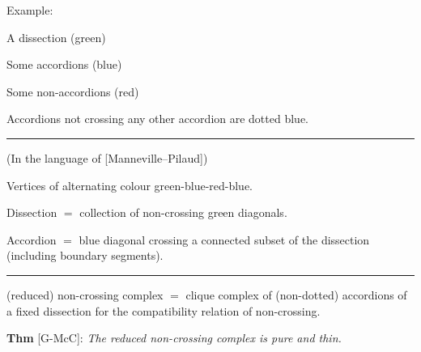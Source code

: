 \documentclass[portrait,final,a0paper,fontscale=0.25]{baposter}
\theoremstyle{definition}
\begin{document}
\begin{poster}
{\vspace*{-3cm}
\begin{minipage}{5.7cm}
Example:

\smallskip
\begin{compactitem}
 \item A dissection (green)
 \item Some accordions (blue)
 \item Some non-accordions (red)
\end{compactitem}

\medskip
Accordions not crossing any other accordion are dotted blue.
\end{minipage}


\vspace{.4cm}
\hspace{-.25cm}
{\color{blue} \rule{10.02cm}{1pt}}
\vspace{-.35cm}

(In the language of [Manneville--Pilaud])

\smallskip

Vertices of alternating colour green-blue-red-blue.

\smallskip

{\color{blue} Dissection} $=$ collection of non-crossing green diagonals.

\smallskip

{\color{blue} Accordion} $=$ blue diagonal crossing a connected subset of the dissection (including boundary segments).


\vspace{-.1cm}
\hspace{-.25cm}
{\color{blue} \rule{10.02cm}{1pt}}
\vspace{-.35cm}

{\color{blue} (reduced) non-crossing complex} $=$ clique complex of (non-dotted) accordions of a fixed dissection for the compatibility relation of non-crossing.

\smallskip

{\color{blue} \bf Thm} [G-McC]: {\it The reduced non-crossing complex is pure and thin.}


}

\end{poster}
\end{document}
